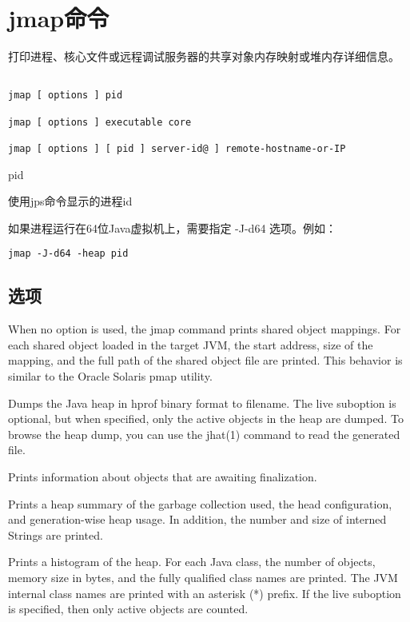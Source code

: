 \section{jmap命令}
\label{chap:tools_jmap}

打印进程、核心文件或远程调试服务器的共享对象内存映射或堆内存详细信息。

\begin{lstlisting}[language=cshell]

jmap [ options ] pid

jmap [ options ] executable core

jmap [ options ] [ pid ] server-id@ ] remote-hostname-or-IP

\end{lstlisting}

pid

使用jps命令显示的进程id


如果进程运行在64位Java虚拟机上，需要指定 -J-d64 选项。例如：

\begin{lstlisting}[language=cshell]
jmap -J-d64 -heap pid
\end{lstlisting}


\subsection{选项}


When no option is used, the jmap command prints shared object mappings. For each shared object loaded in the target JVM, the start address, size of the mapping, and the full path of the shared object file are printed. This
behavior is similar to the Oracle Solaris pmap utility.

Dumps the Java heap in hprof binary format to filename. The live suboption is optional, but when specified, only the active objects in the heap are dumped. To browse the heap dump, you can use the jhat(1) command to read the
generated file.

Prints information about objects that are awaiting finalization.

Prints a heap summary of the garbage collection used, the head configuration, and generation-wise heap usage. In addition, the number and size of interned Strings are printed.

Prints a histogram of the heap. For each Java class, the number of objects, memory size in bytes, and the fully qualified class names are printed. The JVM internal class names are printed with an asterisk (*) prefix. If the live
suboption is specified, then only active objects are counted.

